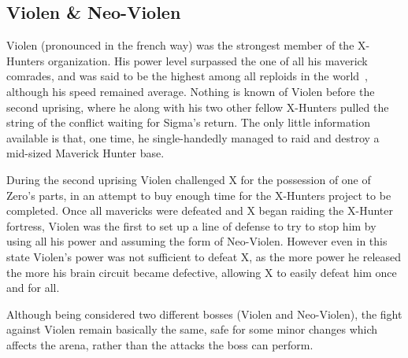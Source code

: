 \subsection{Violen \& Neo-Violen}\label{boss:Neo-Violen}
Violen (pronounced in the french way) was the strongest member of the X-Hunters organization. His power level surpassed the one of all his maverick comrades, and was said to be the highest among all reploids in the world~\cite{wayback:X2_resources}, although his speed remained average. Nothing is known of Violen before the second uprising, where he along with his two other fellow X-Hunters pulled the string of the conflict waiting for Sigma's return. The only little information available is that, one time, he single-handedly managed to raid and destroy a mid-sized Maverick Hunter base. 

During the second uprising Violen challenged X for the possession of one of Zero's parts, in an attempt to buy enough time for the X-Hunters project to be completed. Once all mavericks were defeated and X began raiding the X-Hunter fortress, Violen was the first to set up a line of defense to try to stop him by using all his power and assuming the form of Neo-Violen. However even in this state Violen's power was not sufficient to defeat X, as the more power he released the more his brain circuit became defective, allowing X to easily defeat him once and for all.

Although being considered two different bosses (Violen and Neo-Violen), the fight against Violen remain basically the same, safe for some minor changes which affects the arena, rather than the attacks the boss can perform. 

